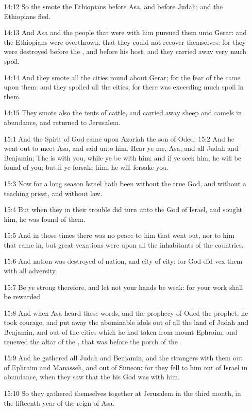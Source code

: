 14:12 So the \LORD smote the Ethiopians before Asa, and before Judah;
and the Ethiopians fled.

14:13 And Asa and the people that were with him pursued them unto
Gerar: and the Ethiopians were overthrown, that they could not recover
themselves; for they were destroyed before the \LORD, and before his
host; and they carried away very much spoil.

14:14 And they smote all the cities round about Gerar; for the fear of
the \LORD came upon them: and they spoiled all the cities; for there
was exceeding much spoil in them.

14:15 They smote also the tents of cattle, and carried away sheep and
camels in abundance, and returned to Jerusalem.

15:1 And the Spirit of God came upon Azariah the son of Oded: 15:2 And
he went out to meet Asa, and said unto him, Hear ye me, Asa, and all
Judah and Benjamin; The \LORD is with you, while ye be with him; and if
ye seek him, he will be found of you; but if ye forsake him, he will
forsake you.

15:3 Now for a long season Israel hath been without the true God, and
without a teaching priest, and without law.

15:4 But when they in their trouble did turn unto the \LORD God of
Israel, and sought him, he was found of them.

15:5 And in those times there was no peace to him that went out, nor
to him that came in, but great vexations were upon all the inhabitants
of the countries.

15:6 And nation was destroyed of nation, and city of city: for God did
vex them with all adversity.

15:7 Be ye strong therefore, and let not your hands be weak: for your
work shall be rewarded.

15:8 And when Asa heard these words, and the prophecy of Oded the
prophet, he took courage, and put away the abominable idols out of all
the land of Judah and Benjamin, and out of the cities which he had
taken from mount Ephraim, and renewed the altar of the \LORD, that was
before the porch of the \LORD.

15:9 And he gathered all Judah and Benjamin, and the strangers with
them out of Ephraim and Manasseh, and out of Simeon: for they fell to
him out of Israel in abundance, when they saw that the \LORD his God
was with him.

15:10 So they gathered themselves together at Jerusalem in the third
month, in the fifteenth year of the reign of Asa.

